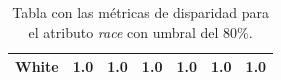 \begin{table}[h]
{\begin{tabular}{ccccccc}
\multicolumn{1}{|c|}{White}                                                              & \multicolumn{1}{c|}{{\color[HTML]{3166FF} 1.0}}                                       & \multicolumn{1}{c|}{{\color[HTML]{3166FF} 1.0}}                                         & \multicolumn{1}{c|}{{\color[HTML]{3166FF} 1.0}}                                       & \multicolumn{1}{c|}{{\color[HTML]{3166FF} 1.0}}                                       & \multicolumn{1}{c|}{{\color[HTML]{3166FF} 1.0}}                                       & \multicolumn{1}{c|}{{\color[HTML]{3166FF} 1.0}}                                       \\ \hline
\end{tabular}
}
	\caption{Tabla con las métricas de disparidad para el atributo \textit{race} con umbral del 80\%.}
    \label{fig:ejaqracelaw}
\end{table}

